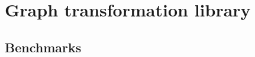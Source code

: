 \section{Graph transformation library}\label{sec-transformations}

\subsection{Benchmarks}\label{sub-benchmarks}
